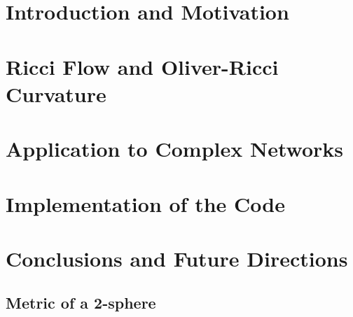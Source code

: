 \documentclass[a4paper,12pt,twoside,online,customfont,custombib,PageStyleI,draftclassic]{Settings/PhDThesisPSnPDF}
\begin{document}
\chapter{Introduction and Motivation}


%


\chapter{Ricci Flow and Oliver-Ricci Curvature}

\chapter{Application to Complex Networks}

\chapter{Implementation of the Code}

\chapter{Conclusions and Future Directions}

\begin{appendices} %
\chapter{Metric of a 2-sphere}

\end{appendices}
\end{document}
